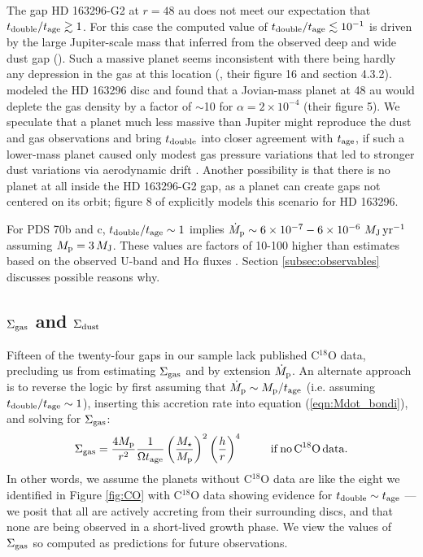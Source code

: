 \documentclass[fleqn,usenatbib]{mnras}
\newcommand{\Sigg}{\Sigma_{\rm gas}}
\newcommand{\Sigd}{\Sigma_{\rm dust}}
\begin{document}
The gap HD 163296-G2 at $r=48$ au does not meet our expectation that $t_{\rm double}/t_{\rm age} \gtrsim 1$. For this case the computed value of $t_{\rm double}/t_{\rm age} \lesssim 10^{-1}$ is driven by the large Jupiter-scale mass that \citet{zhang_etal_2018} inferred from the observed deep and wide dust gap (\citealt{isella_etal_2016, huang_etal_2018}). Such a massive planet seems inconsistent with there being hardly any depression in the gas at this location (\citealt{zhang_etal_2021}, their figure 16 and section 4.3.2).  \cite{rodenkirch_etal_2021} modeled the HD 163296 disc and found that a Jovian-mass planet at 48 au would deplete the gas density by a factor of $\sim$10 for $\alpha = 2 \times 10^{-4}$ (their figure 5). We speculate that a planet much less massive than Jupiter might reproduce the dust and gas observations and bring $t_{\rm double}$ into closer agreement with $t_{\rm age}$, if such a lower-mass planet caused only modest gas pressure variations that led to stronger dust variations via aerodynamic drift \citep[][]{paardekooper_mellema_2004, dong_etal_2017, drazkowska_etal_2019, binkert_etal_2021}. Another possibility is that there is no planet at all inside the HD 163296-G2 gap, as a planet can create gaps not centered on its orbit; figure 8 of \citet{dong_etal_2018} explicitly models this scenario for HD 163296.

For PDS 70b and c, $t_{\rm double}/t_{\rm age} \sim 1$ implies $\dot{M}_{\rm p} \sim 6 \times 10^{-7}- 6 \times 10^{-6}\,\,M_{\rm J}\,\rm yr^{-1}$ assuming $M_{\rm p} = 3\,M_{\rm J}$. These values are factors of 10-100 higher than estimates based on the observed U-band and H$\alpha$ fluxes \citep[e.g.][]{haffert_etal_2019, zhou_etal_2021}. Section \ref{subsec:observables} discusses possible reasons why.


\subsection{$\Sigg$ and $\Sigd$}
\label{subsec:backward}

Fifteen of the twenty-four gaps in our sample lack published C$^{18}$O data, precluding us from estimating $\Sigg$ and by extension $\dot{M}_{\rm p}$. 
An alternate approach is to reverse the logic by first assuming 
that $\dot{M}_{\rm p} \sim M_{\rm p}/t_{\rm age}$ (i.e. assuming $t_{\rm double}/t_{\rm age} \sim 1$), inserting this accretion rate into equation (\ref{eqn:Mdot_bondi}), and solving for $\Sigg$:
\begin{equation}
\Sigg = \frac{4M_{\rm p}}{r^2} \frac{1}{\Omega t_{\rm age}} \left( \frac{M_\star}{M_{\rm p}} \right)^2 \left( \frac{h}{r} \right)^4  \,\,\,\,\,\,\,\,\,\,\,\,\,\,\, {\rm if\,no\,C}^{18}{\rm O \, data.}
\label{eqn:backward}
\end{equation}
In other words, we assume the planets without C$^{18}$O data are like the eight we identified in Figure \ref{fig:CO} with C$^{18}$O data showing evidence for $t_{\rm double} \sim t_{\rm age}$ --- we posit that all are actively accreting from their surrounding discs, and that none are being observed in a short-lived growth phase. We view the values of $\Sigg$ so computed as predictions for future observations.
\end{document}
